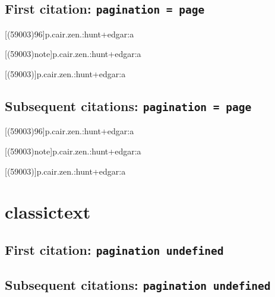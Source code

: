 \documentclass[a4paper]{article}
\begin{document}
\subsection{First citation: \texttt{pagination = page}}

\citereset
\cite{p.cair.zen.:hunt+edgar:a}

\citereset
\cite[(59003)1:96]{p.cair.zen.:hunt+edgar:a}

\citereset
\cite[(59003)96]{p.cair.zen.:hunt+edgar:a}

\citereset
{}[(59003)96]{p.cair.zen.:hunt+edgar:a}

\citereset
{}[(59003)note]{p.cair.zen.:hunt+edgar:a}

\citereset
{}[(59003)]{p.cair.zen.:hunt+edgar:a}

\citereset
\cite[(59003)note]{p.cair.zen.:hunt+edgar:a}

\subsection{Subsequent citations: \texttt{pagination = page}}

\cite{p.cair.zen.:hunt+edgar:a}

\cite[(59003)1:96]{p.cair.zen.:hunt+edgar:a}

\cite[(59003)96]{p.cair.zen.:hunt+edgar:a}

[(59003)96]{p.cair.zen.:hunt+edgar:a}

[(59003)note]{p.cair.zen.:hunt+edgar:a}

[(59003)]{p.cair.zen.:hunt+edgar:a}

\cite[(59003)note]{p.cair.zen.:hunt+edgar:a}

\section{classictext}

\subsection{First citation: \texttt{pagination undefined}}

\cite{heraclitus:epistle1}

\citereset
\cite[577]{heraclitus:epistle1}

\citereset
\cite[note]{heraclitus:epistle1}

\subsection{Subsequent citations: \texttt{pagination undefined}}
\end{document}
